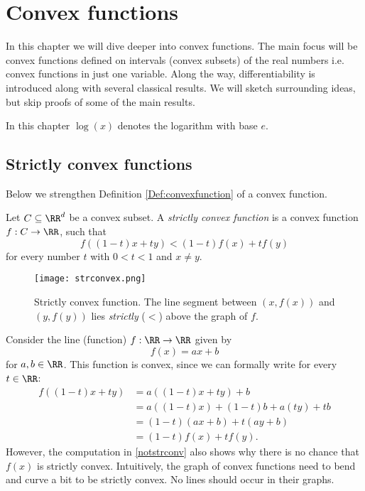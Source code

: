 \documentclass{article}
\begin{document}
\chapter{Convex functions}\label{chapter:convexfunctions}

In this chapter we will dive deeper into convex functions. 
The main focus will be convex functions defined on intervals (convex subsets) of the
real numbers i.e. convex functions in just one variable. Along the way, differentiability is
introduced along with several classical results. We will sketch surrounding ideas, but skip 
proofs of some of the main results.

In this chapter $\log(x)$ denotes the logarithm with base $e$.


\section{Strictly convex functions}

Below we strengthen Definition \ref{Def:convexfunction} of a convex function.

\begin{definition}[emph]
  Let $C \subseteq \RR^d$ be a convex subset.
    A \emph{strictly convex function} is a convex function $f: C\rightarrow \RR$, such that
    $$
    f((1 - t) x + t y) < (1-t) f(x) + t f(y)
    $$
    for every number $t$ with $0< t < 1$ and $x\neq y$. 
  \end{definition}

\begin{frameit}  
  \begin{figure}\label{fignonstrict}
    \texttt{[image: strconvex.png]}
    
Strictly convex function. The line segment between $(x, f(x))$ and $(y, f(y))$ lies \emph{strictly} ($<$) above
the graph of  $f$.
  \end{figure}
  \end{frameit}


  \begin{example}
    Consider the line (function) $f:\RR\rightarrow \RR$ given by
    $$
    f(x) = a x + b
    $$
    for $a, b\in \RR$.
    This function is convex, since we can formally write for every $t\in \RR$:
    \begin{align}\label{notstrconv}
      f((1-t) x + t y) &= a ((1-t) x + t y) + b \\
                       &= a ((1-t) x) + (1-t)b + a (t y) + t b\\
                       &= (1-t)(a x + b) + t(a y + b)\\
                       &= (1-t) f(x) + t f(y).
    \end{align}
    However, the computation in \eqref{notstrconv} also shows why
    there is no chance that $f(x)$ is strictly convex. Intuitively,
    the graph of convex functions need to bend and curve a bit to
    be strictly convex. No lines should occur in their graphs. 
  \end{example}
\end{document}
